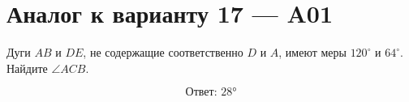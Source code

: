 


\section*{Аналог к варианту 17 — A01}
Дуги \(AB\) и \(DE\), не содержащие соответственно \(D\) и \(A\), имеют меры \(120^\circ\) и \(64^\circ\). Найдите \(\angle ACB\).
\begin{center}\end{center}
\[\boxed{\text{Ответ: }28°}\]


